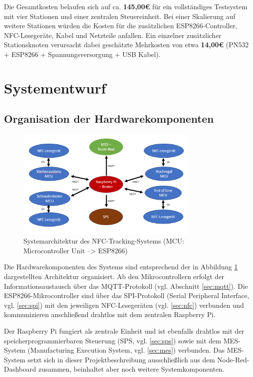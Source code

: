 Die Gesamtkosten belaufen sich auf ca. \textbf{145,00€} für ein vollständiges Testsystem mit vier Stationen und einer zentralen Steuereinheit. Bei einer Skalierung auf weitere Stationen würden die Kosten für die zusätzlichen ESP8266-Controller, NFC-Lesegeräte, Kabel und Netzteile anfallen. Ein einzelner zusätzlicher Stationsknoten verursacht dabei geschätzte Mehrkosten von etwa \textbf{14,00€} (PN532 + ESP8266 + Spannungsversorgung + USB Kabel).

\section{Systementwurf}
\label{sec:systementwurf}

\subsection{Organisation der Hardwarekomponenten}
\begin{figure}[H] %
	\centering
	\includegraphics[width=0.8\textwidth]{images/Systemarchitektur.png}
	\caption{Systemarchitektur des NFC-Tracking-Systems (MCU: Microcontroller Unit --> ESP8266)}
	\label{fig:systemarchitektur}
\end{figure}

Die Hardwarekomponenten des Systems sind entsprechend der in Abbildung \ref{fig:systemarchitektur} dargestellten Architektur organisiert. Ab den Mikrocontrollern erfolgt der Informationsaustausch über das MQTT-Protokoll (vgl. Abschnitt \autoref{sec:mqtt}). Die ESP8266-Mikrocontroller sind über das SPI-Protokoll (Serial Peripheral Interface, vgl. \autoref{sec:spi}) mit den jeweiligen NFC-Lesegeräten (vgl. \autoref{sec:nfc}) verbunden und kommunizieren anschließend drahtlos mit dem zentralen Raspberry Pi.

Der Raspberry Pi fungiert als zentrale Einheit und ist ebenfalls drahtlos mit der speicherprogrammierbaren Steuerung (SPS, vgl. \autoref{sec:sps}) sowie mit dem MES-System (Manufacturing Execution System, vgl. \autoref{sec:mes}) verbunden. Das MES-System setzt sich in dieser Projektbeschreibung ausschließlich aus dem Node-Red-Dashboard zusammen, beinhaltet aber noch weitere Systemkomponenten. 

